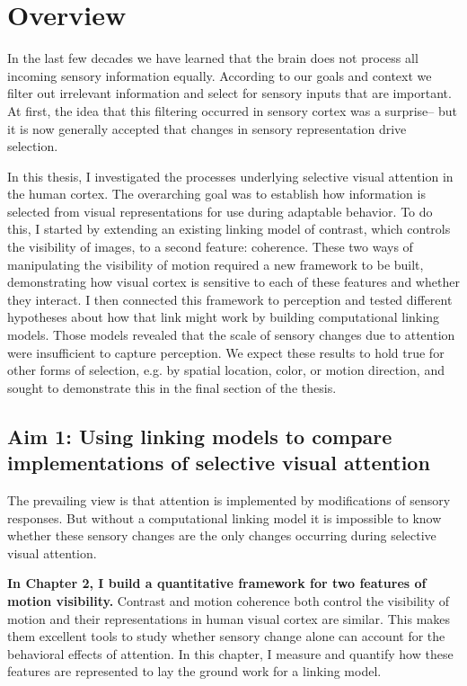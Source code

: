 \section{Overview}

In the last few decades we have learned that the brain does not process all incoming sensory information equally. According to our goals and context we filter out irrelevant information and select for sensory inputs that are important. At first, the idea that this filtering occurred in sensory cortex was a surprise-- but it is now generally accepted that changes in sensory representation drive selection.

In this thesis, I investigated the processes underlying selective visual attention in the human cortex. The overarching goal was to establish how information is selected from visual representations for use during adaptable behavior. To do this, I started by extending an existing linking model of contrast, which controls the visibility of images, to a second feature: coherence. These two ways of manipulating the visibility of motion required a new framework to be built, demonstrating how visual cortex is sensitive to each of these features and whether they interact. I then connected this framework to perception and tested different hypotheses about how that link might work by building computational linking models. Those models revealed that the scale of sensory changes due to attention were insufficient to capture perception. We expect these results to hold true for other forms of selection, e.g. by spatial location, color, or motion direction, and sought to demonstrate this in the final section of the thesis.

\subsection{Aim 1: Using linking models to compare implementations of selective visual attention}

The prevailing view is that attention is implemented by modifications of sensory responses. But without a computational linking model it is impossible to know whether these sensory changes are the only changes occurring during selective visual attention. 

\textbf{In Chapter 2, I build a quantitative framework for two features of motion visibility.} Contrast and motion coherence both control the visibility of motion and their representations in human visual cortex are similar. This makes them excellent tools to study whether sensory change alone can account for the behavioral effects of attention. In this chapter, I measure and quantify how these features are represented to lay the ground work for a linking model.

